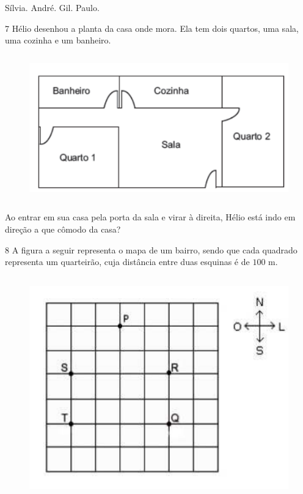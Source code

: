 \begin{boxlist}
 Sílvia.
 André.
 Gil.
 Paulo.
\end{boxlist}




\num{7}  Hélio desenhou a planta da casa onde mora. Ela tem dois quartos, uma
sala, uma cozinha e um banheiro.

\begin{figure}[H]
\centering\includegraphics[width=4.94792in,height=2.46875in]{./imgSAEB_6_MAT/media/image71.png}
\end{figure}

Ao entrar em sua casa pela porta da sala e virar à direita, Hélio está
indo em direção a que cômodo da casa?


\num{8}  A figura a seguir representa o mapa de um bairro, sendo que cada
quadrado representa um quarteirão, cuja distância entre duas esquinas é
de $100$ m.

\begin{figure}[H]
\centering\includegraphics[width=4.82569in,height=3.77917in]{./imgSAEB_6_MAT/media/image72.png}
\end{figure}

